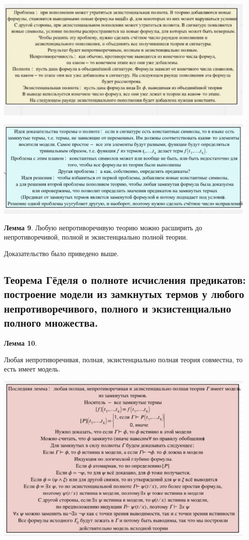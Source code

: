 \includegraphics[width=13cm]{images/1.5_m3}

\includegraphics[width=13cm]{images/1.5_full}

\textbf{Лемма 9}.
Любую непротиворечивую теорию можно расширить до непротиворечивой, полной и экзистенциально полной теории.

Доказательство было приведено выше.

\subsection{Теорема Гёделя о полноте исчисления предикатов: построение модели из замкнутых термов у любого непротиворечивого, полного и экзистенциально полного множества.}

\textbf{Лемма 10}.

Любая непротиворечивая, полная, экзистенциально полная теория совместна, то есть имеет модель.

\includegraphics[width=13cm]{images/1.5_full2}\\

